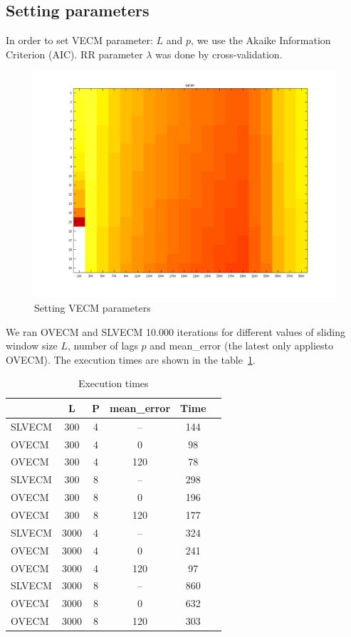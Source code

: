 \subsection{Setting parameters}

In order to set VECM parameter: $L$ and $p$, we use the Akaike Information
Criterion (AIC). RR parameter $\lambda$ was done by cross-validation.

\begin{figure}[h!]
\includegraphics[width=0.5\linewidth]{img/vecm-params}
\caption{Setting VECM parameters}
\label{fig:shrinks}
\end{figure}

We ran OVECM and SLVECM 10.000 iterations for different values of sliding
window size $L$, number of lags $p$ and mean\_error (the latest only appliesto
OVECM). The execution times are shown in the table~\ref{tab:extimes}.

\begin{table}[h!]
\caption{Execution times}
\label{tab:extimes}
\begin{center}
\begin{tabular}{|l|c|c|c|c|c|}
\hline
& \textbf{L} & \textbf{P} & \textbf{mean\_error}  & \textbf{Time} \\
\hline
SLVECM & 300 & 4  & -- & 144\\
OVECM & 300 & 4  & 0 & 98\\
OVECM & 300 & 4  & 120 & 78\\
\hline
SLVECM & 300 & 8  & -- & 298\\
OVECM & 300 & 8  & 0 & 196\\
OVECM & 300 & 8  & 120 & 177\\
\hline
SLVECM & 3000 & 4  & -- & 324\\
OVECM & 3000 & 4  & 0 & 241\\
OVECM & 3000 & 4  & 120 & 97\\
\hline
SLVECM & 3000 & 8  & -- & 860\\
OVECM & 3000 & 8  & 0 & 632\\
OVECM & 3000 & 8  & 120 & 303\\
\hline
\end{tabular}
\end{center}
\end{table}

